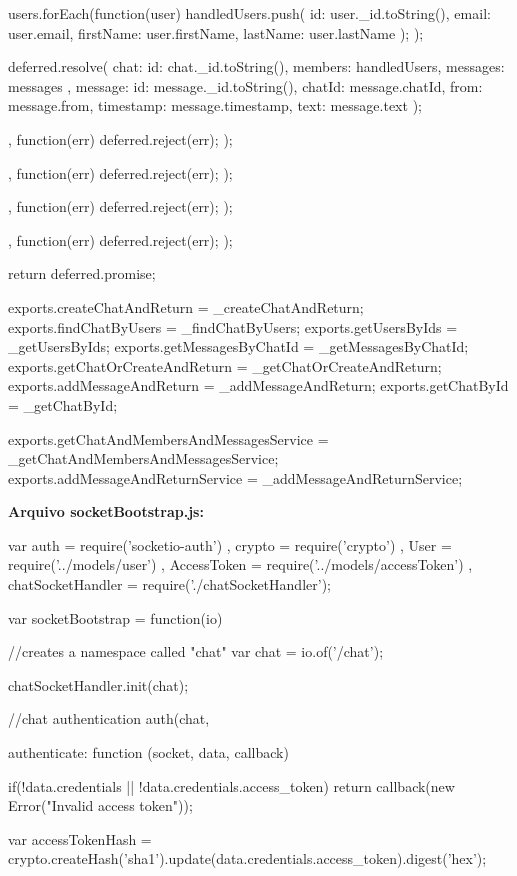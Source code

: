 \begin{flushleft}
{{{{{					users.forEach(function(user) {
						handledUsers.push({
							id: user.\_id.toString(),
							email: user.email,
							firstName: user.firstName,
							lastName: user.lastName
						});
					});
					
					deferred.resolve({
						chat: {
							id: chat.\_id.toString(),
							members: handledUsers,
							messages: messages
						},
						message: {
							id: message.\_id.toString(),
							chatId: message.chatId,
							from: message.from,
							timestamp: message.timestamp,
							text: message.text
						}
					});
					
				}, function(err){ deferred.reject(err); });
				
			}, function(err){ deferred.reject(err); });
			
		}, function(err){ deferred.reject(err); });
		
	}, function(err){ deferred.reject(err); });
	
	return deferred.promise;
}

exports.createChatAndReturn = \_createChatAndReturn;
exports.findChatByUsers = \_findChatByUsers;
exports.getUsersByIds = \_getUsersByIds;
exports.getMessagesByChatId = \_getMessagesByChatId;
exports.getChatOrCreateAndReturn = \_getChatOrCreateAndReturn;
exports.addMessageAndReturn = \_addMessageAndReturn;
exports.getChatById = \_getChatById;

exports.getChatAndMembersAndMessagesService = \_getChatAndMembersAndMessagesService;
exports.addMessageAndReturnService = \_addMessageAndReturnService;

\textbf{Arquivo socketBootstrap.js:}

var auth = require('socketio-auth')
, crypto = require('crypto')
, User = require('../models/user')
, AccessToken = require('../models/accessToken')
, chatSocketHandler = require('./chatSocketHandler');

var socketBootstrap = function(io) {
	//creates a namespace called "chat"
	var chat = io.of('/chat');
	
	chatSocketHandler.init(chat);
	
	//chat authentication
	auth(chat, {
		authenticate: function (socket, data, callback) {
			if(!data.credentials || !data.credentials.access\_token)
			return callback(new Error("Invalid access token"));
			
			var accessTokenHash = crypto.createHash('sha1').update(data.credentials.access\_token).digest('hex');
			
}}}
\end{flushleft}
